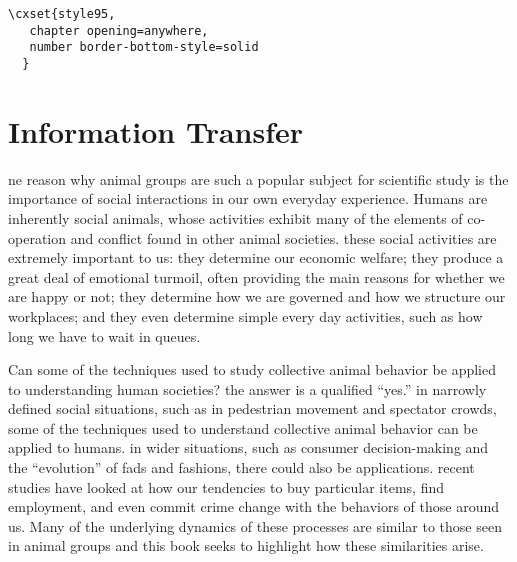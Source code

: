 
\example
\begin{verbatim}
\cxset{style95,
   chapter opening=anywhere,
   number border-bottom-style=solid
  }
\end{verbatim}


          
 \chapter[Template 95]{Information Transfer}         
          
 ne reason why animal groups are such a popular subject for scientific
study is the importance of social interactions in our own everyday experience.
Humans are inherently social animals, whose activities exhibit
many of the elements of co-operation and conflict found in other animal
societies. these social activities are extremely important to us: they determine
our economic welfare; they produce a great deal of emotional
turmoil, often providing the main reasons for whether we are happy
or not; they determine how we are governed and how we structure our
workplaces; and they even determine simple every day activities, such as
how long we have to wait in queues.

Can some of the techniques used to study collective animal behavior
be applied to understanding human societies? the answer is a qualified
“yes.” in narrowly defined social situations, such as in pedestrian movement
and spectator crowds, some of the techniques used to understand
collective animal behavior can be applied to humans. in wider situations,
such as consumer decision-making and the “evolution” of fads and fashions,
there could also be applications. recent studies have looked at how
our tendencies to buy particular items, find employment, and even commit
crime change with the behaviors of those around us. Many of the underlying
dynamics of these processes are similar to those seen in animal
groups and this book seeks to highlight how these similarities arise. 

          
      

